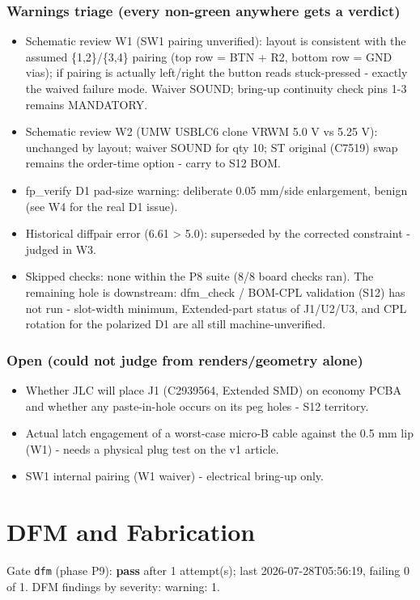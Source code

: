 \documentclass[11pt,a4paper]{article}
\begin{document}
\subsubsection*{Warnings triage (every non-green anywhere gets a verdict)}
\begin{itemize}
\item Schematic review W1 (SW1 pairing unverified): layout is consistent with
the assumed \{1,2\}/\{3,4\} pairing (top row = BTN + R2, bottom row = GND
vias); if pairing is actually left/right the button reads stuck-pressed -
exactly the waived failure mode. Waiver SOUND; bring-up continuity check
pins 1-3 remains MANDATORY.
\item Schematic review W2 (UMW USBLC6 clone VRWM 5.0 V vs 5.25 V): unchanged by
layout; waiver SOUND for qty 10; ST original (C7519) swap remains the
order-time option - carry to S12 BOM.
\item fp\_verify D1 pad-size warning: deliberate 0.05 mm/side enlargement,
benign (see W4 for the real D1 issue).
\item Historical diffpair error (6.61 \textgreater{} 5.0): superseded by the corrected
constraint - judged in W3.
\item Skipped checks: none within the P8 suite (8/8 board checks ran). The
remaining hole is downstream: dfm\_check / BOM-CPL validation (S12) has not
run - slot-width minimum, Extended-part status of J1/U2/U3, and CPL
rotation for the polarized D1 are all still machine-unverified.
\end{itemize}
\subsubsection*{Open (could not judge from renders/geometry alone)}
\begin{itemize}
\item Whether JLC will place J1 (C2939564, Extended SMD) on economy PCBA and
whether any paste-in-hole occurs on its peg holes - S12 territory.
\item Actual latch engagement of a worst-case micro-B cable against the 0.5 mm
lip (W1) - needs a physical plug test on the v1 article.
\item SW1 internal pairing (W1 waiver) - electrical bring-up only.
\end{itemize}
\section{DFM and Fabrication}
Gate \texttt{dfm} (phase P9): \textbf{pass} after 1 attempt(s); last 2026-07-28T05:56:19, failing 0 of 1.
DFM findings by severity: warning: 1.
\end{document}

